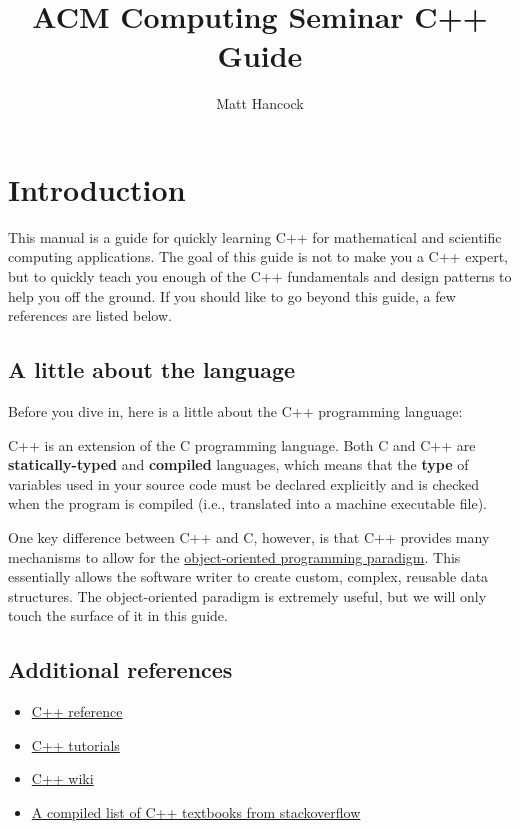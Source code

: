 \documentclass[11pt]{article}
\author{Matt Hancock}
\date{}
\title{ACM Computing Seminar C++ Guide}
\begin{document}
\maketitle
\tableofcontents


\section{Introduction}
\label{sec:orgheadline4}
This manual is a guide for quickly learning C++ for mathematical and 
scientific computing applications. The goal of this guide is not to 
make you a C++ expert, but to quickly teach you enough of the C++ 
fundamentals and design patterns to help you off the ground. If you 
should like to go beyond this guide, a few references are listed below.

\subsection{A little about the language}
\label{sec:orgheadline1}
Before you dive in, here is a little about the C++ programming language:

C++ is an extension of the C programming language. Both C and C++ are 
\textbf{statically-typed} and \textbf{compiled} languages, which means that the \textbf{type} 
of variables used in your source code must be declared explicitly and is 
checked when the program is compiled (i.e., translated into a machine 
executable file).

One key difference between C++ and C, however, is that C++ provides 
many mechanisms to allow for the \href{https://en.wikipedia.org/wiki/Object-oriented_programming}{object-oriented programming paradigm}. This 
essentially allows the software writer to create custom, complex, 
reusable data structures. The object-oriented paradigm is extremely useful, 
but we will only touch the surface of it in this guide.

\subsection{Additional references}
\label{sec:orgheadline2}
\begin{itemize}
\item \href{http://cppreference.com}{C++ reference}
\item \href{http://www.cplusplus.com/doc/tutorial}{C++ tutorials}
\item \href{https://en.wikipedia.org/wiki/C\%2B\%2B}{C++ wiki}
\item \href{http://stackoverflow.com/questions/388242/the-definitive-c-book-guide-and-list}{A compiled list of C++ textbooks from stackoverflow}
\end{itemize}
\end{document}
